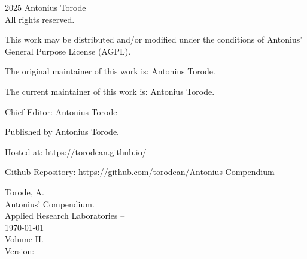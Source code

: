 \pagestyle{empty}
\begingroup
\footnotesize
\parindent 0pt
\parskip \baselineskip
\textcopyright{} 2025 Antonius Torode \\
All rights reserved.

This work may be distributed and/or modified under the conditions of Antonius’ General Purpose License (AGPL).

The original maintainer of this work is: Antonius Torode.

The current maintainer of this work is: Antonius Torode.


Chief Editor: Antonius Torode


Published by Antonius Torode. 

Hosted at: https://torodean.github.io/

Github Repository: https://github.com/torodean/Antonius-Compendium


\vfill

Torode, A.\\
\hspace*{1em} Antonius' Compendium. \\
\hspace*{2em} Applied Research Laboratories -- \\
\hspace*{2em} \today \\
\hspace*{2em} Volume II. \\
\hspace*{2em} Version: \Version



\endgroup
\clearpage